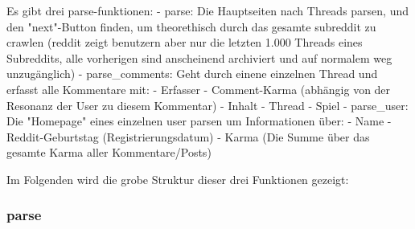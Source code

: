 \documentclass[11pt]{article}
\begin{document}
Es gibt drei parse-funktionen: - parse: Die Hauptseiten nach Threads
parsen, und den "next"-Button finden, um theorethisch durch das gesamte
subreddit zu crawlen (reddit zeigt benutzern aber nur die letzten 1.000
Threads eines Subreddits, alle vorherigen sind anscheinend archiviert
und auf normalem weg unzugänglich) - parse\_comments: Geht durch einene
einzelnen Thread und erfasst alle Kommentare mit: - Erfasser -
Comment-Karma (abhängig von der Resonanz der User zu diesem Kommentar) -
Inhalt - Thread - Spiel - parse\_user: Die "Homepage" eines einzelnen
user parsen um Informationen über: - Name - Reddit-Geburtstag
(Registrierungsdatum) - Karma (Die Summe über das gesamte Karma aller
Kommentare/Posts)

Im Folgenden wird die grobe Struktur dieser drei Funktionen gezeigt:

    \subsubsection{parse}\label{parse}
\end{document}
